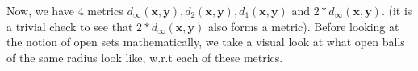 \begin{frame}
    Now, we have 4 metrics \( d_\infty(\boldsymbol{x}, \boldsymbol{y}), d_2(\boldsymbol{x}, \boldsymbol{y}), d_1(\boldsymbol{x}, \boldsymbol{y}) \text{ and } 2*d_\infty(\boldsymbol{x}, \boldsymbol{y})\). (it is a trivial check to see that $2*d_\infty(\boldsymbol{x}, \boldsymbol{y})$ also forms a metric). Before looking at the notion of open sets mathematically, we take a visual look at what open balls of the same radius look like, w.r.t each of these metrics. \\
    \begin{center}
    \end{center}
\end{frame}